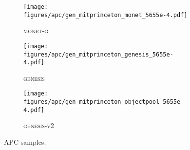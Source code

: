 \documentclass{article}
\begin{document}
\begin{figure}[h!]
	\centering
	\begin{subfigure}{\linewidth}
	    \texttt{[image: figures/apc/gen\_mitprinceton\_monet\_5655e-4.pdf]}
	    \caption{\textsc{monet-g}}
	    \vspace{6pt}
	\end{subfigure}
	\begin{subfigure}{\linewidth}
	    \texttt{[image: figures/apc/gen\_mitprinceton\_genesis\_5655e-4.pdf]}
	    \caption{\textsc{genesis}}
	    \vspace{6pt}
	\end{subfigure}
	\begin{subfigure}{\linewidth}
	    \texttt{[image: figures/apc/gen\_mitprinceton\_objectpool\_5655e-4.pdf]}
	    \caption{\textsc{genesis-v2}}
	\end{subfigure}
	\caption{APC samples.}
	\label{fig:gpp:apc:gen}
\end{figure}
\end{document}
